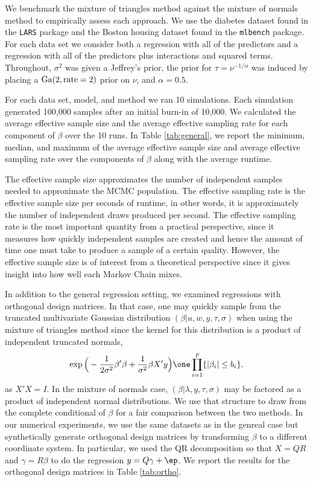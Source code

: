 \documentclass{article}
\begin{document}
We benchmark the mixture of triangles method against the mixture of normals
method to empirically assess each approach.  We use the diabetes dataset found
in the \texttt{LARS} package and the Boston housing dataset found in the
\texttt{mlbench} package.  For each data set we consider both a regression with
all of the predictors and a regression with all of the predictors plus
interactions and squared terms.  Throughout, $\sigma^2$ was given a Jeffrey's
prior, the prior for $\tau = \nu^{-1/\alpha}$ was induced by placing a
$\textmd{Ga}(2, \textmd{rate}=2)$ prior on $\nu$, and $\alpha = 0.5$.

For each data set, model, and method we ran 10 simulations.  Each simulation
generated 100,000 samples after an initial burn-in of 10,000.  We calculated the
average effective sample size and the average effective sampling rate for each
component of $\beta$ over the 10 runs.  In Table \ref{tab:general}, we report
the minimum, median, and maximum of the average effective sample size and
average effective sampling rate over the components of $\beta$ along with the
average runtime.

The effective sample size approximates the number of independent samples needed
to approximate the MCMC population.  The effective sampling rate is the
effective sample size per seconds of runtime, in other words, it is
approximately the number of independent draws produced per second.  The effective
sampling rate is the most important quantity from a practical perspective, since
it measures how quickly independent samples are created and hence the amount of
time one must take to produce a sample of a certain quality.  However, the
effective sample size is of interest from a theoretical perspective since it
gives insight into how well each Markov Chain mixes.

In addition to the general regression setting, we examined regressions with
orthogonal design matrices.  In that case, one may quickly sample from the
truncated multivariate Gaussian distribution $(\beta | u, w, y, \tau, \sigma)$
when using the mixture of triangles method since the kernel for this
distribution is a product of independent truncated normals,
\[
\exp \Big( -\frac{1}{2 \sigma^2} \beta' \beta + \frac{1}{\sigma^2} \beta X' y
\Big) \one \prod_{i=1}^p \{|\beta_i| \leq b_i \},
\]
as $X'X = I$.  In the mixture of normals case, $(\beta | \lambda, y, \tau,
\sigma)$ may be factored as a product of independent normal distributions.  We
use that structure to draw from the complete conditional of $\beta$ for a fair
comparison between the two methods.  In our numerical experiments, we use the
same datasets as in the genreal case but synthetically generate orthogonal
design matrices by transforming $\beta$ to a different coordinate system.  In
particular, we used the QR decomposition so that $X = QR$ and $\gamma = R \beta$
to do the regression $y = Q \gamma + \ep$.  We report the results for the
orthogonal design matrices in Table \ref{tab:ortho}.
\end{document}
